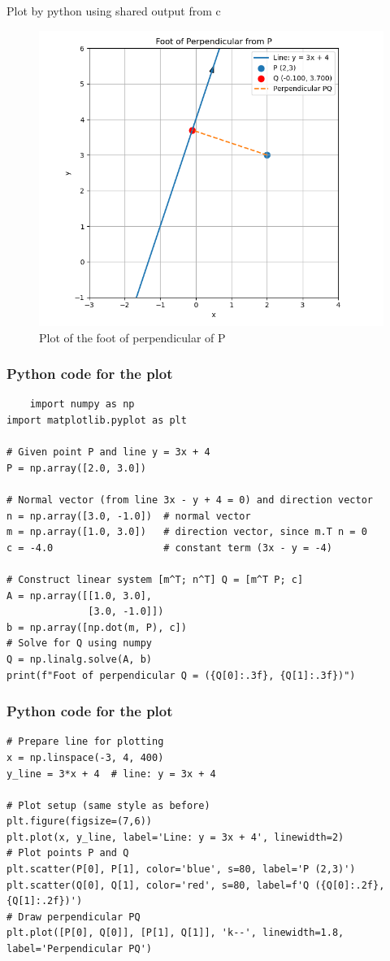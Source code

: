 \documentclass{beamer}
\begin{document}
\begin{frame}{Plot by python using shared output from c}
	\begin{center}
	\begin{figure}[H]
		\centering
		\includegraphics[width = 0.7\columnwidth]{figs/fig1.png}
		\caption{Plot of the foot of perpendicular of P}
		\label{fig1}
	\end{figure}
	\end{center}
\end{frame}
\begin{frame}[fragile]
     \frametitle{Python code for the plot}
\begin{lstlisting}
    import numpy as np
import matplotlib.pyplot as plt

# Given point P and line y = 3x + 4
P = np.array([2.0, 3.0])

# Normal vector (from line 3x - y + 4 = 0) and direction vector
n = np.array([3.0, -1.0])  # normal vector
m = np.array([1.0, 3.0])   # direction vector, since m.T n = 0
c = -4.0                   # constant term (3x - y = -4)

# Construct linear system [m^T; n^T] Q = [m^T P; c]
A = np.array([[1.0, 3.0],
              [3.0, -1.0]])
b = np.array([np.dot(m, P), c])
# Solve for Q using numpy
Q = np.linalg.solve(A, b)
print(f"Foot of perpendicular Q = ({Q[0]:.3f}, {Q[1]:.3f})")
\end{lstlisting}
\end{frame}
\begin{frame}[fragile]
   \frametitle{Python code for the plot}
    \begin{lstlisting}
# Prepare line for plotting
x = np.linspace(-3, 4, 400)
y_line = 3*x + 4  # line: y = 3x + 4

# Plot setup (same style as before)
plt.figure(figsize=(7,6))
plt.plot(x, y_line, label='Line: y = 3x + 4', linewidth=2)
# Plot points P and Q
plt.scatter(P[0], P[1], color='blue', s=80, label='P (2,3)')
plt.scatter(Q[0], Q[1], color='red', s=80, label=f'Q ({Q[0]:.2f}, {Q[1]:.2f})')
# Draw perpendicular PQ
plt.plot([P[0], Q[0]], [P[1], Q[1]], 'k--', linewidth=1.8, label='Perpendicular PQ')

 \end{lstlisting}
\end{frame}
\end{document}
